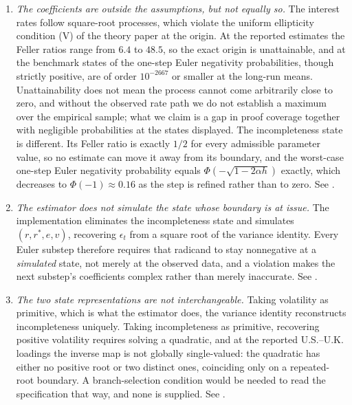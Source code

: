 \documentclass[11pt]{article}
\theoremstyle{definition}
\begin{document}
\begin{enumerate}[label=(\roman*)]
\item \emph{The coefficients are outside the assumptions, but not equally so.} The interest rates follow square-root processes, which violate the uniform ellipticity condition (V) of the theory paper at the origin. At the reported estimates the Feller ratios range from $6.4$ to $48.5$, so the exact origin is unattainable, and at the benchmark states of  the one-step Euler negativity probabilities, though strictly positive, are of order $10^{-2667}$ or smaller at the long-run means. Unattainability does not mean the process cannot come arbitrarily close to zero, and without the observed rate path we do not establish a maximum over the empirical sample; what we claim is a gap in proof coverage together with negligible probabilities at the states displayed. The incompleteness state is different. Its Feller ratio is exactly $1/2$ for every admissible parameter value, so no estimate can move it away from its boundary, and the worst-case one-step Euler negativity probability equals $\Phi(-\sqrt{1-2\alpha h})$ exactly, which decreases to $\Phi(-1)\approx0.16$ as the step is refined rather than to zero. See .
\item \emph{The estimator does not simulate the state whose boundary is at issue.} The implementation eliminates the incompleteness state and simulates $(r,r^*,e,v)$, recovering $\epsilon_t$ from a square root of the variance identity. Every Euler substep therefore requires that radicand to stay nonnegative at a \emph{simulated} state, not merely at the observed data, and a violation makes the next substep's coefficients complex rather than merely inaccurate. See .
\item \emph{The two state representations are not interchangeable.} Taking volatility as primitive, which is what the estimator does, the variance identity reconstructs incompleteness uniquely. Taking incompleteness as primitive, recovering positive volatility requires solving a quadratic, and at the reported U.S.--U.K. loadings the inverse map is not globally single-valued: the quadratic has either no positive root or two distinct ones, coinciding only on a repeated-root boundary. A branch-selection condition would be needed to read the specification that way, and none is supplied. See .

\end{enumerate}
\end{document}
